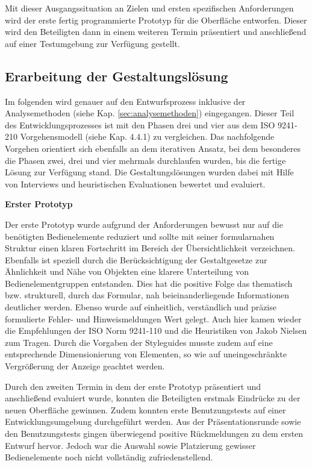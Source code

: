 Mit dieser Ausgangssituation an Zielen und ersten spezifischen Anforderungen wird der erste fertig programmierte Prototyp für die Oberfläche entworfen. Dieser wird den Beteiligten dann in einem weiteren Termin präsentiert und anschließend auf einer Testumgebung zur Verfügung gestellt.


\subsection{Erarbeitung der Gestaltungslösung}
Im folgenden wird genauer auf den Entwurfsprozess inklusive der Analysemethoden (siehe Kap. \ref{sec:analysemethoden}) eingegangen. Dieser Teil des Entwicklungsprozesses ist mit den Phasen drei und vier aus dem ISO 9241-210 Vorgehensmodell (siehe Kap. 4.4.1) zu vergleichen. Das nachfolgende Vorgehen orientiert sich ebenfalls an dem iterativen Ansatz, bei dem besonderes die Phasen zwei, drei und vier mehrmals durchlaufen wurden, bis die fertige Lösung zur Verfügung stand. Die Gestaltungslösungen wurden dabei mit Hilfe von Interviews und heuristischen Evaluationen bewertet und evaluiert.

\textbf{Erster Prototyp}

Der erste Prototyp wurde aufgrund der Anforderungen bewusst nur auf die benötigten Bedienelemente reduziert und sollte mit seiner formularnahen Struktur einen klaren Fortschritt im Bereich der Übersichtlichkeit verzeichnen. Ebenfalls ist speziell durch die Berücksichtigung der Gestaltgesetze zur Ähnlichkeit und Nähe von Objekten eine klarere Unterteilung von Bedienelementgruppen entstanden. Dies hat die positive Folge das thematisch bzw. strukturell, durch das Formular, nah beieinanderliegende Informationen deutlicher werden. Ebenso wurde auf einheitlich, verständlich und präzise formulierte Fehler- und Hinweismeldungen Wert gelegt. Auch hier kamen wieder die Empfehlungen der ISO Norm 9241-110 und die Heuristiken von Jakob Nielsen zum Tragen. Durch die Vorgaben der Styleguides musste zudem auf eine entsprechende Dimensionierung von Elementen, so wie auf uneingeschränkte Vergrößerung der Anzeige geachtet werden.

Durch den zweiten Termin in dem der erste Prototyp präsentiert und anschließend evaluiert wurde, konnten die Beteiligten erstmals Eindrücke zu der neuen Oberfläche gewinnen. Zudem konnten erste Benutzungstests auf einer Entwicklungsumgebung durchgeführt werden. Aus der Präsentationsrunde sowie den Benutzungstests gingen überwiegend positive Rückmeldungen zu dem ersten Entwurf hervor. Jedoch war die Auswahl sowie Platzierung gewisser Bedienelemente noch nicht vollständig zufriedenstellend. 

